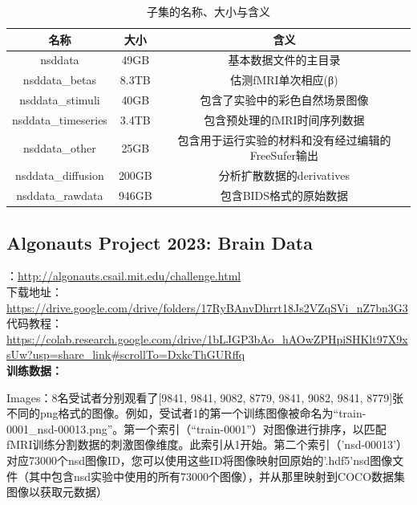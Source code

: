\documentclass[12pt, a4paper, oneside]{ctexart}
\begin{document}
    \begin{table}[ptbp]
        \begin{center}
            \caption{子集的名称、大小与含义}
            \label{subset}
            \begin{tabular}{c|c|c} %
                \textbf{名称} & \textbf{大小} & \textbf{含义}\\
                \hline
                nsddata & 49GB & 基本数据文件的主目录\\
                nsddata\_betas & 8.3TB
                & 估测fMRI单次相应(β)\\
                nsddata\_stimuli & 40GB & 包含了实验中的彩色自然场景图像\\
                nsddata\_timeseries & 3.4TB & 包含预处理的fMRI时间序列数据\\
                nsddata\_other & 25GB & 包含用于运行实验的材料和没有经过编辑的FreeSufer输出\\
                nsddata\_diffusion & 200GB & 分析扩散数据的derivatives \\
                nsddata\_rawdata & 946GB & 包含BIDS格式的原始数据
            \end{tabular}
        \end{center}
    \end{table}

    \subsection{Algonauts Project 2023: Brain Data}
    ：\url{http://algonauts.csail.mit.edu/challenge.html}\\
    下载地址：\url{https://drive.google.com/drive/folders/17RyBAnvDhrrt18Js2VZqSVi_nZ7bn3G3}\\
    代码教程：\url{https://colab.research.google.com/drive/1bLJGP3bAo_hAOwZPHpiSHKlt97X9xsUw?usp=share_link#scrollTo=DxkcThGURffq}\\
    \textbf{训练数据：}

    Images：8名受试者分别观看了[9841, 9841, 9082, 8779, 9841, 9082, 9841, 8779]张不同的png格式的图像。例如，受试者1的第一个训练图像被命名为“train-0001\_nsd-00013.png”。第一个索引（“train-0001”）对图像进行排序，以匹配fMRI训练分割数据的刺激图像维度。此索引从1开始。第二个索引（'nsd-00013'）对应73000个nsd图像ID，您可以使用这些ID将图像映射回原始的'.hdf5'nsd图像文件（其中包含nsd实验中使用的所有73000个图像），并从那里映射到COCO数据集图像以获取元数据）
\end{document}
